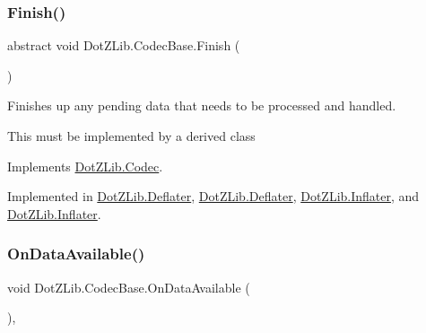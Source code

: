 \subsubsection{\texorpdfstring{Finish()}{Finish()}\hspace{0.1cm}{\footnotesize\ttfamily [2/2]}}
{\footnotesize\ttfamily abstract void Dot\+Z\+Lib.\+Codec\+Base.\+Finish (\begin{DoxyParamCaption}{ }\end{DoxyParamCaption})\hspace{0.3cm}{\ttfamily [pure virtual]}}



Finishes up any pending data that needs to be processed and handled. 

This must be implemented by a derived class

Implements \hyperlink{interface_dot_z_lib_1_1_codec_af12b887d445dcbc5e7c11b3aa000aa27}{Dot\+Z\+Lib.\+Codec}.



Implemented in \hyperlink{class_dot_z_lib_1_1_deflater_a84507769a20a13c2ff48cfcef8f5c13b}{Dot\+Z\+Lib.\+Deflater}, \hyperlink{class_dot_z_lib_1_1_deflater_a84507769a20a13c2ff48cfcef8f5c13b}{Dot\+Z\+Lib.\+Deflater}, \hyperlink{class_dot_z_lib_1_1_inflater_aa70c9d026f5d1b44fe0679b78973285c}{Dot\+Z\+Lib.\+Inflater}, and \hyperlink{class_dot_z_lib_1_1_inflater_aa70c9d026f5d1b44fe0679b78973285c}{Dot\+Z\+Lib.\+Inflater}.

\mbox{\label{class_dot_z_lib_1_1_codec_base_a5c697195bc017ae951858e7c8948f9ae}} 
\subsubsection{\texorpdfstring{On\+Data\+Available()}{OnDataAvailable()}\hspace{0.1cm}{\footnotesize\ttfamily [1/2]}}
{\footnotesize\ttfamily void Dot\+Z\+Lib.\+Codec\+Base.\+On\+Data\+Available (\begin{DoxyParamCaption}{ }\end{DoxyParamCaption})\hspace{0.3cm}{\ttfamily [inline]}, {\ttfamily [protected]}}



